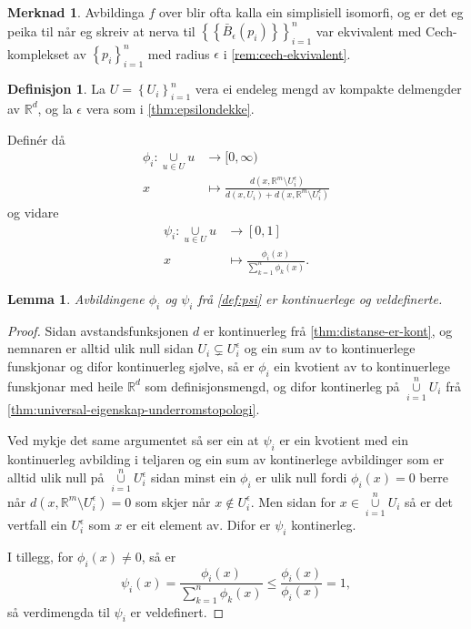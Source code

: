 \documentclass[a4paper, 12pt, norsk]{article}
\theoremstyle{plain}
\newtheorem{lemma}[theorem]{Lemma}
\theoremstyle{definition}
\newtheorem{definition}[theorem]{Definisjon}
\newtheorem{remark}[theorem]{Merknad}
\newcommand{\Rb}{\mathbb{R}}
\newcommand{\union}{ \mathop{\cup}\limits }
\newcommand{\set}[1]{ \left\{ #1 \right\} } %
\begin{document}
\begin{remark}
	Avbildinga \( f \) over blir ofta kalla ein simplisiell isomorfi, og er det eg peika til når eg skreiv at nerva til \( \set{\set{\bar{B}_\epsilon(p_i)}}_{i=1}^n \) var ekvivalent med Cech-komplekset av \( \set{p_i}_{i=1}^n \) med radius \( \epsilon \) i \autoref{rem:cech-ekvivalent}.
\end{remark}

\begin{definition} \label{def:psi}
	La \( U = \set{U_i}_{i=1}^n \) vera ei endeleg mengd av kompakte delmengder av \( \Rb^d \), og la \( \epsilon \) vera som i \autoref{thm:epsilondekke}.

	Definér då
	\begin{align*}
		\phi_i : \union_{u \in U} u &\to [0, \infty) \\
		x &\mapsto \frac{d(x, \Rb^m \setminus U_i^\epsilon)}{d(x, U_i) + d(x, \Rb^m \setminus U_i^\epsilon)}
	\end{align*}
	og vidare
	\begin{align*}
		\psi_i : \union_{u \in U} u &\to [0, 1] \\
		x &\mapsto \frac{\phi_i(x)}{\sum_{k=1}^n \phi_k(x)}.
	\end{align*}
\end{definition}

\begin{lemma}
	Avbildingene \( \phi_i \) og \( \psi_i \) frå \autoref{def:psi} er kontinuerlege og veldefinerte.
\end{lemma}

\begin{proof} 
	Sidan avstandsfunksjonen \( d \) er kontinuerleg frå \autoref{thm:distanse-er-kont}, og nemnaren er alltid ulik null sidan \( U_i \subsetneq U_i^\epsilon \) og ein sum av to kontinuerlege funskjonar og difor kontinuerleg sjølve, så er \( \phi_i \) ein kvotient av to kontinuerlege funskjonar med heile \( \Rb^d \) som definisjonsmengd, og difor kontinerleg på \( \union_{i=1}^n U_i \) frå \autoref{thm:universal-eigenskap-underromstopologi}.

	Ved mykje det same argumentet så ser ein at \( \psi_i \) er ein kvotient med ein kontinuerleg avbilding i teljaren og ein sum av kontinerlege avbildinger som er alltid ulik null på \( \union_{i=1}^n U_i^\epsilon \) sidan minst ein \( \phi_i \) er ulik null fordi \( \phi_i(x)=0 \) berre når \( d(x, \Rb^m \setminus U_i^\epsilon)=0 \) som skjer når \( x \not\in U_i^\epsilon \). Men sidan for \( x \in \union_{i=1}^n U_i \) så er det vertfall ein \( U_i^\epsilon \) som \( x \) er eit element av. Difor er \( \psi_i \) kontinerleg.

	I tillegg, for \( \phi_i(x) \neq 0 \), så er
	\[
		\psi_i(x) = \frac{\phi_i(x)}{\sum_{k=1}^n \phi_k(x)} \leq \frac{\phi_i(x)}{\phi_i(x)} = 1,
	\]
	så verdimengda til \( \psi_i \) er veldefinert.
\end{proof}
\end{document}
